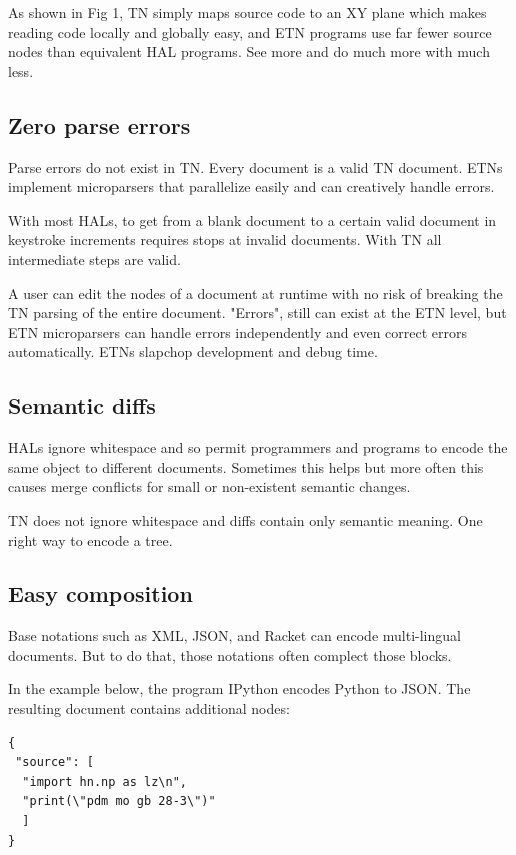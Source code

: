 \documentclass[journal]{IEEEtran}
\begin{document}
As shown in Fig 1, TN simply maps source code to an XY plane which makes reading code locally and globally easy, and ETN programs use far fewer source nodes than equivalent HAL programs. See more and do much more with much less.

\subsection{Zero parse errors}

Parse errors do not exist in TN. Every document is a valid TN document. ETNs implement microparsers that parallelize easily and can creatively handle errors.

With most HALs, to get from a blank document to a certain valid document in keystroke increments requires stops at invalid documents. With TN all intermediate steps are valid.

A user can edit the nodes of a document at runtime with no risk of breaking the TN parsing of the entire document. "Errors", still can exist at the ETN level, but ETN microparsers can handle errors independently and even correct errors automatically. ETNs slapchop development and debug time.

\subsection{Semantic diffs}

HALs ignore whitespace and so permit programmers and programs to encode the same object to different documents. Sometimes this helps but more often this causes merge conflicts for small or non-existent semantic changes.

TN does not ignore whitespace and diffs contain only semantic meaning. One right way to encode a tree.

\subsection{Easy composition}

Base notations such as XML\cite{Bray}, JSON\cite{Crockford}, and Racket\cite{Racket} can encode multi-lingual documents. But to do that, those notations often complect those blocks.

In the example below, the program IPython encodes Python to JSON. The resulting document contains additional nodes:

\begin{lstlisting}
{
 "source": [
  "import hn.np as lz\n",
  "print(\"pdm mo gb 28-3\")"
  ]
}
\end{lstlisting}
\end{document}
